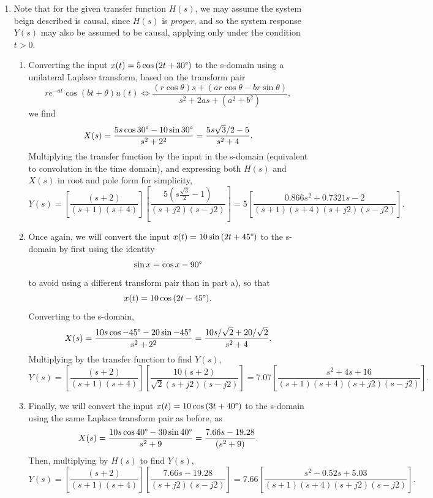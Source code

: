 \documentclass{article}
\begin{document}
\begin{enumerate}[label=\thesubsubsection]
			\[
			  V(s) = sY(s) + \frac{1}{s}Y(s).
			\]
			Substituting \(Y(s)\),
			\[
			  V(s) = \frac{10s^2 + 10s}{3s^2+s+1} + \frac{10s+10}{3s^3+s+1}.
			\]
			Using similar methods as before to convert to the time domain,
			\[
				v(t) = \frac{10}{3}\delta(t) + 10u(t) + e^{\frac{-t}{6}}\left[\frac{-70}{9}\cos{(\frac{\sqrt{11}}{6}t)} + \frac{50}{9\sqrt{11}}\sin{(\frac{\sqrt{11}}{6}t)}\right]u(t).
			\]
			\setcounter{subsection}{8}
			\setcounter{subsubsection}{2}
		\item Note that for the given transfer function \(H(s)\), we may assume the system beign described is causal, since \(H(s)\) is \textit{proper}, and so the system response \(Y(s)\) may also be assumed to be causal, applying only under the condition \(t > 0\).
			\begin{enumerate}[label=\alph*)]
				\item Converting the input \(x(t) = 5\cos{(2t+30\degree)}\) to the s-domain using a unilateral Laplace transform, based on the transform pair
					\[
						re^{-at}\cos{(bt+\theta)}u(t) \Leftrightarrow \frac{(r\cos{\theta})s + (ar\cos{\theta}-br\sin{\theta})}{s^2 + 2as +(a^2+b^2)},
					\]
					we find
					\[
						X(s) = \frac{5s\cos{30\degree - 10\sin{30\degree}}}{s^2  + 2^2} = \frac{5s \sqrt{3}/2 - 5}{s^2 + 4}.
					\]
					Multiplying the transfer function by the input in the s-domain (equivalent to convolution in the time domain), and expressing both \(H(s)\) and \(X(s)\) in root and pole form for simplicity,
					\[
						Y(s) = \left[\frac{(s+2)}{(s+1)(s+4)}\right]\left[\frac{5(s\frac{\sqrt{3}}{2} - 1)}{(s+j2)(s-j2)}\right] = 5\left[\frac{0.866s^2+0.7321s - 2}{(s+1)(s+4)(s+j2)(s-j2)}\right]. 
					\]
				\item Once again, we will convert the input \(x(t) = 10\sin{(2t+45\degree)}\) to the s-domain by first using the identity
					\[
						\sin{x} = \cos{x-90\degree}
					\]
					to avoid using a different transform pair than in part a), so that 
					\[
						x(t) = 10\cos{(2t - 45\degree)}.
					\]
					Converting to the s-domain, 
					\[
						X(s) = \frac{10s\cos{-45\degree} - 20\sin{-45\degree}}{s^2 + 2^2} = \frac{10s/\sqrt{2} + 20/\sqrt{2}}{s^2+4}.
					\]
					Multiplying by the transfer function to find \(Y(s)\),
					\[
						Y(s) = \left[\frac{(s+2)}{(s+1)(s+4)}\right]\left[\frac{10(s+2)}{\sqrt{2}(s+j2)(s-j2)}\right] = 7.07\left[\frac{s^2+4s+16}{(s+1)(s+4)(s+j2)(s-j2)}\right].
					\]
				\item Finally, we will convert the input \(x(t) = 10\cos{(3t+40\degree)}\) to the s-domain using the same Laplace transform pair as before, as
					\[
						X(s) = \frac{10s\cos{40\degree} - 30\sin{40\degree}}{s^2 + 9} = \frac{7.66s-19.28}{(s^2+9)}.
					\]
					Then, multiplying by \(H(s)\) to find \(Y(s)\),
					\[
						Y(s) = \left[\frac{(s+2)}{(s+1)(s+4)}\right]\left[\frac{7.66s - 19.28}{(s+j2)(s-j2)}\right] = 7.66\left[\frac{s^2-0.52s+5.03}{(s+1)(s+4)(s+j2)(s-j2)}\right].
					\]
			\end{enumerate}
\end{enumerate}
\end{document}
